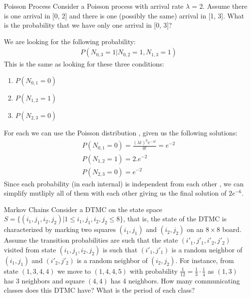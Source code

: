 \begin{problem}{Poisson Process}
Consider a Poisson process with arrival rate $\lambda$ = 2. Assume there is one arrival in [0, 2] and there is one (possibly the same) arrival in [1, 3]. What is the probability that we have only one arrival in [0, 3]?
\end{problem}

\begin{solution}
We are looking for the following probability:
\begin{align*}
    &P(N_{0,3}=1 |N_{0,2}=1, N_{1,3}=1) 
\end{align*}
This is the same as looking for these three conditions:
\begin{enumerate}
    \item $P(N_{0,1}=0)$
    \item $P(N_{1,2}=1)$
    \item $P(N_{2,3}=0)$
\end{enumerate}
For each we can use the Poisson distribution , given us the following solutions:
\begin{align*}
    &P(N_{0,1}=0)= \frac{(\lambda t) ^0 e^ {-\lambda t}}{0!}= e^{-2}\\
    &P(N_{1,2}=1)=2.e^{-2}\\
    &P(N_{2,3}=0)=e^{-2}
\end{align*}
Since each probability (in each internal) is independent from each other , we can simplify mutliply all of them with each other giving us the final solution of $2e^{-6}$.
\end{solution}

\begin{problem}{Markov Chains}
Consider a DTMC on the state space \( S = \{(i_1, j_1, i_2, j_2) | 1 \leq i_1, j_1, i_2, j_2 \leq 8\} \), that is, the state of the DTMC is characterized by marking two squares \( (i_1, j_1) \) and \( (i_2, j_2) \) on an \( 8 \times 8 \) board. Assume the transition probabilities are such that the state \( (i'_1, j'_1, i'_2, j'_2) \) visited from state \( (i_1, j_1, i_2, j_2) \) is such that \( (i'_1, j'_1) \) is a random neighbor of \( (i_1, j_1) \) and \( (i'_2, j'_2) \) is a random neighbor of \( (i_2, j_2) \). For instance, from state \( (1, 3, 4, 4) \) we move to \( (1, 4, 4, 5) \) with probability \( \frac{1}{12} = \frac{1}{3} \cdot \frac{1}{4} \) as \( (1, 3) \) has 3 neighbors and square \( (4, 4) \) has 4 neighbors. How many communicating classes does this DTMC have? What is the period of each class?
\end{problem}

